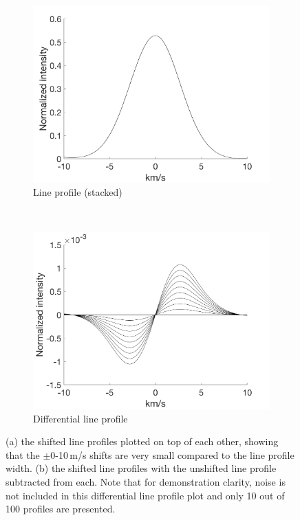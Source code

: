 \begin{figure}[tbp]
    \begin{subfigure}[b]{0.49\textwidth}
        \includegraphics[width=\textwidth]{./Figures/Methods/1-Line_Profile.png}
        \caption{Line profile (stacked)}
        \label{fig:line_profiles}
    \end{subfigure}
	~
    \begin{subfigure}[b]{0.49\textwidth}
        \includegraphics[width=\textwidth]{./Figures/Methods/1-Differential_line_Profile.png}
        \caption{Differential line profile}
        \label{fig:differential_line_profiles}
    \end{subfigure}	
    
    \caption[100 shifted HARPS-like line profiles]{(a) the shifted line profiles plotted on top of each other, showing that 		the $\pm$0-10\,m/s shifts are very small compared to the line profile width. (b) the shifted line profiles with the 			unshifted line profile subtracted from each. Note that for demonstration clarity, noise is not included in this 				differential line profile plot and only 10 out of 100 profiles are presented.}
\label{fig:line_profiles12}
\end{figure}	

